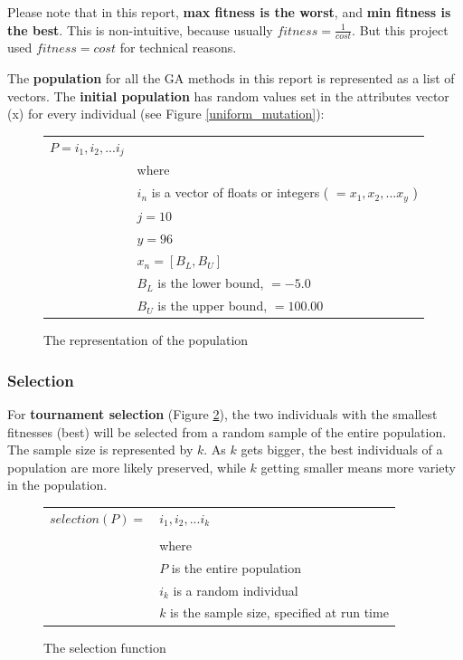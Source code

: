Please note that in this report, \textbf{max fitness is the worst}, and 
\textbf{min fitness is the best}. This is non-intuitive, because usually 
$ fitness = \frac{1}{cost} $. But this project used $ fitness = cost $ for 
technical reasons.

The \textbf{population} for all the GA methods in this report is represented as a list of vectors. The \textbf{initial population} has random values set in the attributes vector (x) for every individual (see Figure \ref{uniform_mutation}):
\begin{figure}[!h]
	\begin{center}
		\begin{tabular}{r l}
		$ P = i_1, i_2, ... i_j $& \\
					& where \\
					& $ i_n $ is a vector of floats or integers ( $ = x_1, x_2, ... x_y $ ) \\
					& $ j = 10 $ \\
					& $ y = 96 $ \\
					& $ x_n = [B_L, B_U] $ \\
					& $ B_L $ is the lower bound, $ = -5.0$ \\
					& $ B_U $ is the upper bound, $ = 100.00$\\
		\end{tabular} 
               	\caption{The representation of the population}
                \label{population}
        \end{center}
\end{figure}

\subsubsection{Selection}
For \textbf{tournament selection} (Figure \ref{selection}), the two individuals with the smallest fitnesses (best) will be selected from a random sample of the entire population. The sample size is represented by $ k $. As $ k $ gets bigger, the best individuals of a population are more likely preserved, while $ k $ getting smaller means more variety in the population. 
\begin{figure}[!h]
        \begin{center}
		\begin{tabular}{r l}
			$ selection(P) = $ &$ i_1, i_2, ... i_k$ \\
					& \\
					& where \\
					& $ P $ is the entire population \\
					& $ i_k $ is a random individual \\
					& $ k $ is the sample size, specified at run time \\
		\end{tabular} 
               \caption{The selection function}
                \label{selection}
        \end{center}
\end{figure}

